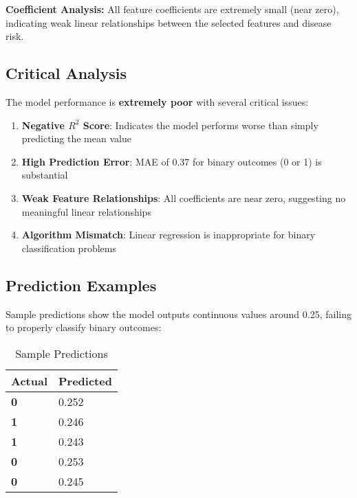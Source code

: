 \documentclass[12pt,a4paper]{article}
\begin{document}
\begin{infobox}
\textbf{Coefficient Analysis:} All feature coefficients are extremely small (near zero), indicating weak linear relationships between the selected features and disease risk.
\end{infobox}

\subsection{Critical Analysis}
\begin{warningbox}
The model performance is \textbf{extremely poor} with several critical issues:
\end{warningbox}

\vspace{0.5cm}

\begin{enumerate}[leftmargin=1.5em]
    \item \textbf{\textcolor{warningred}{Negative $R^2$ Score}}: Indicates the model performs worse than simply predicting the mean value
    \item \textbf{\textcolor{warningred}{High Prediction Error}}: MAE of 0.37 for binary outcomes (0 or 1) is substantial
    \item \textbf{\textcolor{accentorange}{Weak Feature Relationships}}: All coefficients are near zero, suggesting no meaningful linear relationships
    \item \textbf{\textcolor{warningred}{Algorithm Mismatch}}: Linear regression is inappropriate for binary classification problems
\end{enumerate}

\subsection{Prediction Examples}
Sample predictions show the model outputs continuous values around 0.25, failing to properly classify binary outcomes:

\begin{table}[H]
\centering
\caption{Sample Predictions}
\begin{tabular}{>{\centering}p{2cm} >{\centering\arraybackslash}p{2cm}}
\toprule
\rowcolor{primaryblue!20}
\textbf{Actual} & \textbf{Predicted} \\
\midrule
\textcolor{successgreen}{\textbf{0}} & \textcolor{warningred}{0.252} \\
\rowcolor{lightgray}
\textcolor{warningred}{\textbf{1}} & \textcolor{warningred}{0.246} \\
\textcolor{warningred}{\textbf{1}} & \textcolor{warningred}{0.243} \\
\rowcolor{lightgray}
\textcolor{successgreen}{\textbf{0}} & \textcolor{warningred}{0.253} \\
\textcolor{successgreen}{\textbf{0}} & \textcolor{warningred}{0.245} \\
\bottomrule
\end{tabular}
\end{table}
\end{document}
